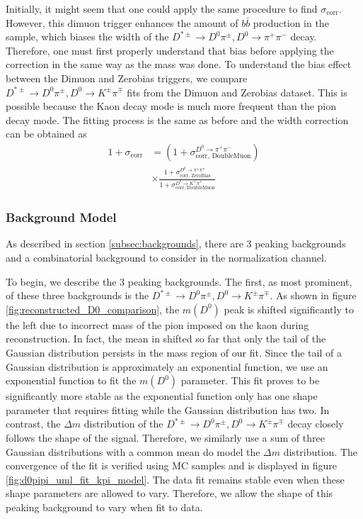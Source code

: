 Initially, it might seem that one could apply the same procedure to find $\sigma_{\text{corr}}$. However, this dimuon trigger enhances the amount of $b\bar{b}$ production in the sample, which biases the width of the $D^{*\pm}\to D^0 \pi^\pm, D^0 \to \pi^+ \pi^-$ decay. Therefore, one must first properly understand that bias before applying the correction in the same way as the mass was done. To understand the bias effect between the Dimuon and Zerobias triggers, we compare $D^{*\pm}\to D^0 \pi^\pm, D^0 \to K^\pm \pi^\mp$ fits from the Dimuon and Zerobias dataset. This is possible because the Kaon decay mode is much more frequent than the pion decay mode. The fitting process is the same as before and the width correction 
can be obtained as
\begin{equation}
    \begin{split}
        1+\sigma_{\text{corr}} &= \left(1+\sigma_{\text{corr, DoubleMuon}}^{D^0\to\pi^+\pi^-}\right) \\
        &\times \frac{
            1+\sigma_{\text{corr, ZeroBias}}^{D^0\to\pi^\pm\pi^\mp}
        }{
            1+\sigma_{\text{corr, DoubleMuon}}^{D^0\to K^\pm\pi^\mp}
        }
    \end{split}
\end{equation}    


\subsubsection{Background Model}

As described in section \ref{subsec:backgrounds}, there are 3 peaking backgrounds and a combinatorial background to consider in the normalization channel. 

To begin, we describe the 3 peaking backgrounds. The first, as most prominent, of these three backgrounds is the $D^{*\pm} \to D^0\pi^\pm, D^0 \to K^\pm \pi^\mp$. As shown in figure \ref{fig:reconstructed_D0_comparison}, the $m(D^0)$ peak is shifted significantly to the left due to incorrect mass of the pion imposed on the kaon during reconstruction. In fact, the mean in shifted so far that only the tail of the Gaussian distribution persists in the mass region of our fit. Since the tail of a Gaussian distribution is approximately an exponential function, we use an exponential function to fit the $m(D^0)$ parameter. This fit proves to be significantly more stable as the exponential function only has one shape parameter that requires fitting while the Gaussian distribution has two. In contrast, the $\Delta m$ distribution of the $D^{*\pm} \to D^0\pi^\pm, D^0 \to K^\pm \pi^\mp$ decay closely follows the shape of the signal. Therefore, we similarly use a sum of three Gaussian distributions with a common mean do model the $\Delta m$ distribution. The convergence of the fit is verified using MC samples and is displayed in figure \ref{fig:d0pipi_uml_fit_kpi_model}. The data fit remains stable even when these shape parameters are allowed to vary. Therefore, we allow the shape of this peaking background to vary when fit to data. 

